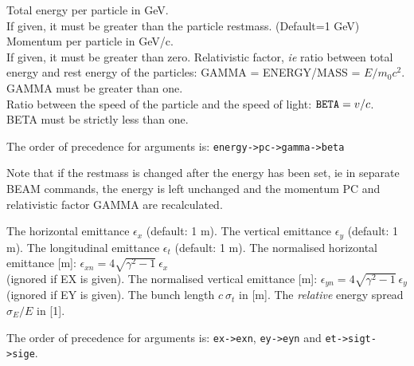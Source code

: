 \begin{madlist}
   \label{beam_energy} Total energy per particle in
  GeV.\\ If given, it must be greater than the particle
  restmass. (Default=1 GeV)
   Momentum per particle in GeV/c. \\
  If given, it must be greater than zero. 
   Relativistic factor, {\sl ie} ratio between total
  energy and rest energy of the particles: GAMMA = ENERGY/MASS = $E / m_0 c^2$. \\
  GAMMA must be greater than one.\\ 
   Ratio between the speed of the particle
  and the speed of light: ${\tt BETA} = v / c$.\\
  BETA must be strictly less than one.
\end{madlist}  
The order of precedence for arguments is: {\tt energy->pc->gamma->beta}

Note that if the restmass is changed after the energy has been set, ie
in separate BEAM commands, the energy is left unchanged and the momentum
PC and relativistic factor GAMMA are recalculated. 
\\

\begin{madlist}
   The horizontal emittance $\epsilon_x$ (default: 1 m). 
   The vertical emittance $\epsilon_y$ (default: 1 m). 
   The longitudinal emittance $\epsilon_t$ (default: 1 m). 
   The normalised horizontal emittance [m]:
  $\epsilon_{xn} = 4 \sqrt{\gamma^2 - 1} \ \epsilon_x$ \\ 
  (ignored if EX is given).  
   The normalised vertical emittance [m]:
  $\epsilon_{yn} = 4 \sqrt{\gamma^2 - 1} \ \epsilon_y$ \\ 
  (ignored if EY is given).  
   The bunch length $c\ \sigma_t$ in [m].  
   The \emph{relative} energy spread
  $\sigma_E / E$ in [1].  
\end{madlist} 

The order of precedence for arguments is: {\tt ex->exn}, {\tt ey->eyn} and
{\tt et->sigt->sige}.



